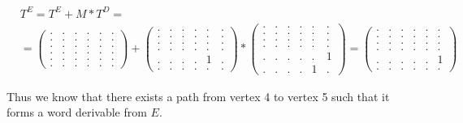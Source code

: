 {
    \renewcommand{\arraystretch}{0.7}
    \setlength\arraycolsep{2pt}
\begin{align*}
&T^E = T^E + M * T^D = \\ &=
\begin{pmatrix}
    . & . & . & . & . & . \\
    . & . & . & . & . & . \\
    . & . & . & . & . & . \\
    . & . & . & . & . & . \\
    . & . & . & . & . & . \\
    . & . & . & . & . & .
\end{pmatrix}+
\begin{pmatrix}
    . & . & . & . & . & . \\
    . & . & . & . & . & . \\
    . & . & . & . & . & . \\
    . & . & . & . & . & . \\
    . & . & . & . & 1 & . \\
    . & . & . & . & . & .
\end{pmatrix}*
\begin{pmatrix}
    . & . & . & . & . & . \\
    . & . & . & . & . & . \\
    . & . & . & . & . & . \\
    . & . & . & . & . & . \\
    . & . & . & . & . & 1 \\
    . & . & . & . & 1 & .
\end{pmatrix}=
\begin{pmatrix}
    . & . & . & . & . & . \\
    . & . & . & . & . & . \\
    . & . & . & . & . & . \\
    . & . & . & . & . & . \\
    . & . & . & . & . & 1 \\
    . & . & . & . & . & .
\end{pmatrix}
\end{align*}
}

Thus we know that there exists a path from vertex 4 to vertex 5 such that it forms a word derivable from $E$.

